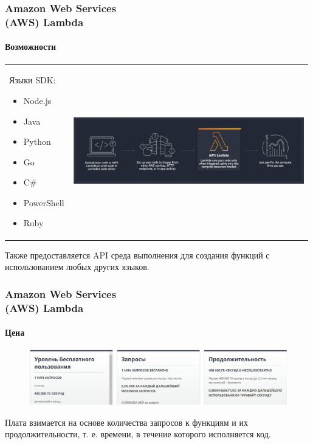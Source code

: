 \documentclass{beamer}
\begin{document}
    \begin{frame}
        \frametitle{Amazon Web Services\\(AWS) Lambda}
        \framesubtitle{Возможности}
        \begin{tabular}{m{0.21\linewidth}m{0.78\linewidth}}
            {
            \footnotesize
            Языки SDK:
            \begin{itemize}
                \item Node.js
                \item Java
                \item Python
                \item Go
                \item C\#
                \item PowerShell
                \item Ruby
            \end{itemize}
            }
            &
            \centering
            \includegraphics[width=\linewidth]{images/aws-opp}
 		\end{tabular}
        Также предоставляется API среда выполнения для создания функций с использованием любых других языков.
    \end{frame}


    \begin{frame}
        \frametitle{Amazon Web Services\\(AWS) Lambda}
        \framesubtitle{Цена}
        \begin{figure}
            \includegraphics[width=\linewidth]{images/awsPrice}
        \end{figure}
        Плата взимается на основе количества запросов к функциям и их продолжительности, т. е. времени, в течение которого исполняется код.
    \end{frame}
\end{document}
